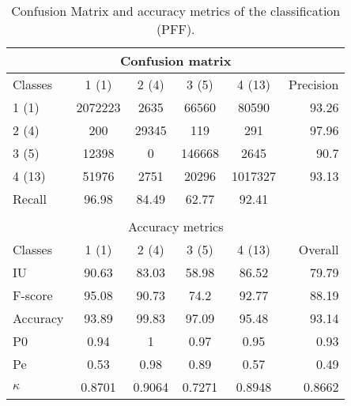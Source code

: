 \begin{table}[H]
\begin{center}
\footnotesize
\begin{tabular}{|l|c|c|c|c|r|}
\hline
\multicolumn{6}{|c|}{Confusion matrix} \\
\hline
 Classes & 1 (1) & 2 (4) & 3 (5) & 4 (13) & Precision \\
\hline
1 (1) & 2072223 & 2635 & 66560 & 80590 & 93.26 \\
\hline
2 (4) & 200 & 29345 & 119 & 291 & 97.96 \\
\hline
3 (5) & 12398 & 0 & 146668 & 2645 & 90.7 \\
\hline
4 (13) & 51976 & 2751 & 20296 & 1017327 & 93.13 \\
\hline
Recall & 96.98 & 84.49 & 62.77 & 92.41 &  \\
\hline
\multicolumn{6}{c}{ } \\
\hline
\multicolumn{6}{|c|}{Accuracy metrics} \\
\hline
 Classes & 1 (1) & 2 (4) & 3 (5) & 4 (13) & Overall \\
\hline
IU & 90.63 & 83.03 & 58.98 & 86.52 & 79.79 \\
\hline
F-score & 95.08 & 90.73 & 74.2 & 92.77 & 88.19 \\
\hline
Accuracy & 93.89 & 99.83 & 97.09 & 95.48 & 93.14 \\
\hline
P0 & 0.94 & 1 & 0.97 & 0.95 & 0.93 \\
\hline
Pe & 0.53 & 0.98 & 0.89 & 0.57 & 0.49 \\
\hline
$\kappa$ & 0.8701 & 0.9064 & 0.7271 & 0.8948 & 0.8662 \\
\hline
\end{tabular}
\caption{Confusion Matrix and accuracy metrics of the classification (PFF).}
\label{table:}
\end{center}
\end{table}
